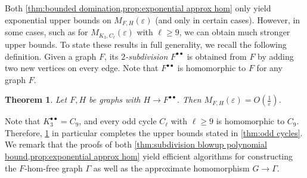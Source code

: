 \documentclass[reqno, english, 12pt]{amsart}
\theoremstyle{plain}
\newtheorem{theorem}{Theorem}[section]
\theoremstyle{remark}
\renewcommand{\geq}{\geqslant}
\begin{document}
Both \cref{thm:bounded domination,prop:exponential approx hom} only yield exponential upper bounds on $M_{F,H}(\varepsilon)$ (and only in certain cases). However, in some cases, such as for $M_{K_3,C_\ell}(\varepsilon)$ with $\ell \geq 9$, we can obtain much stronger upper bounds. To state these results in full generality, we recall the following definition. Given a graph $F$, its \emph{$2$-subdivision} $F^{\bullet\bullet}$ is obtained from $F$ by adding two new vertices on every edge. Note that $F^{\bullet \bullet}$ is homomorphic to $F$ for any graph $F$.
\begin{theorem}\label{thm:subdivision blowup polynomial bound}
	Let $F,H$ be graphs with $H \to F^{\bullet \bullet}$. Then $M_{F,H}(\varepsilon) = O(\frac 1 \varepsilon)$.
\end{theorem}
Note that $K_3^{\bullet\bullet}= C_9$, and every odd cycle $C_\ell$ with $\ell \geq 9$ is homomorphic to $C_9$. Therefore, \cref{thm:subdivision blowup polynomial bound} in particular completes the upper bounds stated in \cref{thm:odd cycles}. We remark that the proofs of both \cref{thm:subdivision blowup polynomial bound,prop:exponential approx hom} yield efficient algorithms for constructing the $F$-hom-free graph $\Gamma$ as well as the approximate homomorphism $G \to \Gamma$. 
\end{document}
